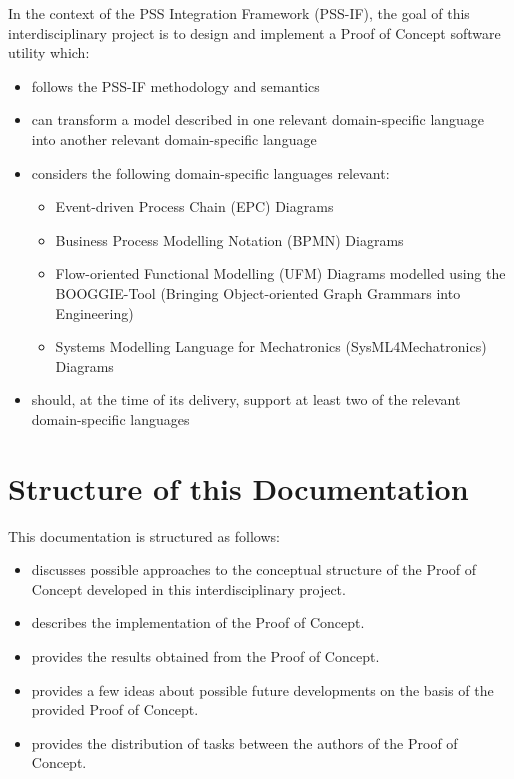 In the context of the PSS Integration Framework (PSS-IF), the goal of this interdisciplinary project is to design and implement a Proof of Concept software utility which:

\begin{itemize}
\item follows the PSS-IF methodology and semantics
\item can transform a model described in one relevant domain-specific language into another relevant domain-specific language
\item considers the following domain-specific languages relevant:
	\begin{itemize}
	\item Event-driven Process Chain (EPC) Diagrams
	\item Business Process Modelling Notation (BPMN) Diagrams
	\item Flow-oriented Functional Modelling (UFM) Diagrams modelled using the BOOGGIE-Tool (Bringing Object-oriented Graph Grammars into Engineering)
	\item Systems Modelling Language for Mechatronics (SysML4Mechatronics) Diagrams
	\end{itemize}
\item should, at the time of its delivery, support at least two of the relevant domain-specific languages
\end{itemize} 

\section*{Structure of this Documentation}

This documentation is structured as follows:

\begin{itemize}
\item \textbf{} discusses possible approaches to the conceptual structure of the Proof of Concept developed in this interdisciplinary project.
\item \textbf{} describes the implementation of the Proof of Concept.
\item \textbf{} provides the results obtained from the Proof of Concept.
\item \textbf{} provides a few ideas about possible future developments on the basis of the provided Proof of Concept.
\item \textbf{} provides the distribution of tasks between the authors of the Proof of Concept.
\end{itemize}


